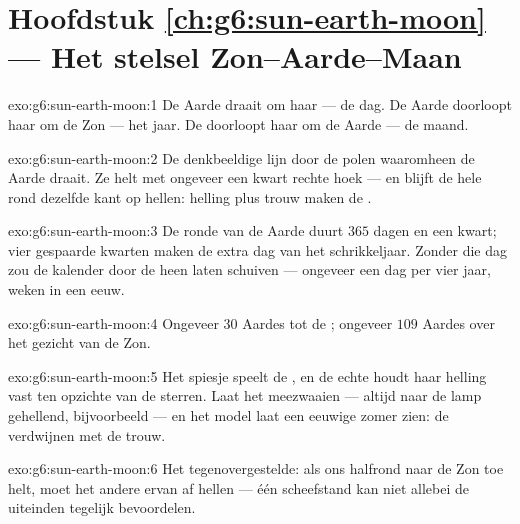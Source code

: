 \section*{Hoofdstuk \ref{ch:g6:sun-earth-moon} --- Het stelsel Zon--Aarde--Maan}

\begin{solution}{exo:g6:sun-earth-moon:1}
De Aarde draait om haar  --- de dag. De Aarde doorloopt haar
 om de Zon --- het jaar. De  doorloopt haar
 om de Aarde --- de maand.
\end{solution}

\begin{solution}{exo:g6:sun-earth-moon:2}
De denkbeeldige lijn door de polen waaromheen de Aarde draait. Ze helt
met ongeveer een kwart rechte hoek --- en blijft de hele
 rond dezelfde kant op hellen: helling plus trouw maken de
.
\end{solution}

\begin{solution}{exo:g6:sun-earth-moon:3}
De ronde van de Aarde duurt $365$ dagen en een kwart; vier gespaarde
kwarten maken de extra dag van het schrikkeljaar. Zonder die dag zou
de kalender door de  heen laten schuiven --- ongeveer een dag per
vier jaar, weken in een eeuw.
\end{solution}

\begin{solution}{exo:g6:sun-earth-moon:4}
Ongeveer $30$ Aardes tot de ; ongeveer $109$ Aardes over het
gezicht van de Zon.
\end{solution}

\begin{solution}{exo:g6:sun-earth-moon:5}
Het spiesje speelt de , en de echte  houdt haar helling vast
ten opzichte van de sterren. Laat het meezwaaien --- altijd naar de
lamp gehellend, bijvoorbeeld --- en het model laat een eeuwige zomer
zien: de  verdwijnen met de trouw.
\end{solution}

\begin{solution}{exo:g6:sun-earth-moon:6}
Het tegenovergestelde: als ons halfrond naar de Zon toe helt, moet het
andere ervan af hellen --- één scheefstand kan niet allebei de
uiteinden tegelijk bevoordelen.
\end{solution}

